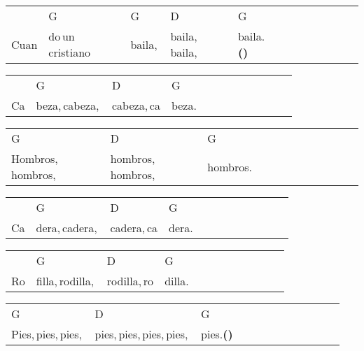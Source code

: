 \begin{multicols}{2}
\begin{minipage}{\columnwidth}
\noindent
\begin{tabular}{llllllllllll}
&G&G&D&G\\
Cuan&do\,un\,cristiano\,&baila,\,&baila,\,baila,\,&baila.\textbf{(\texttimes2)}
\end{tabular}

\noindent
\begin{tabular}{llllllllllll}
&G&D&G\\
Ca&beza,\,cabeza,\,&cabeza,\,ca&beza.
\end{tabular}

\noindent
\begin{tabular}{llllllllllll}
G&D&G\\
Hombros,\,hombros,\,&hombros,\,hombros,\,&hombros.
\end{tabular}

\noindent
\begin{tabular}{llllllllllll}
&G&D&G\\
Ca&dera,\,cadera,\,&cadera,\,ca&dera.
\end{tabular}

\noindent
\begin{tabular}{llllllllllll}
&G&D&G\\
Ro&filla,\,rodilla,\,&rodilla,\,ro&dilla.
\end{tabular}

\noindent
\begin{tabular}{llllllllllll}
G&D&G\\
Pies,\,pies,\,pies,\,&pies,\,pies,\,pies,\,pies,\,&pies.\textbf{(\texttimes2)}
\end{tabular}
\end{minipage}\\

\end{multicols}